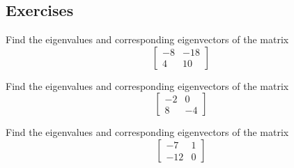 \subsection{Exercises}
\begin{exercise}\ansMark%
Find the eigenvalues and corresponding eigenvectors of the matrix 
\[ \begin{bmatrix} -8 & -18 \\ 4 & 10 \end{bmatrix} \]
\end{exercise}

\begin{exercise}\ansMark%
Find the eigenvalues and corresponding eigenvectors of the matrix 
\[ \begin{bmatrix} -2 & 0 \\ 8 & -4 \end{bmatrix} \]
\end{exercise}

\begin{exercise}\ansMark%
Find the eigenvalues and corresponding eigenvectors of the matrix 
\[ \begin{bmatrix} -7 & 1 \\ -12 & 0 \end{bmatrix} \]
\end{exercise}

